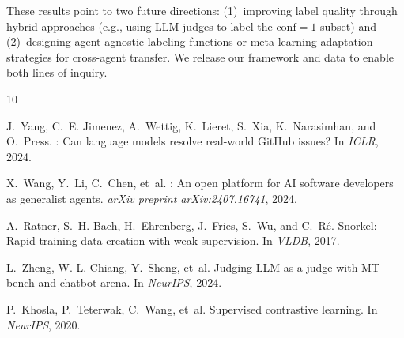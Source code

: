 \documentclass[11pt]{article}
\begin{document}
These results point to two future directions: (1)~improving label quality through hybrid approaches (e.g., using LLM judges to label the $\text{conf}\!=\!1$ subset) and (2)~designing agent-agnostic labeling functions or meta-learning adaptation strategies for cross-agent transfer.
We release our framework and data to enable both lines of inquiry.


\begin{thebibliography}{10}

J.~Yang, C.~E. Jimenez, A.~Wettig, K.~Lieret, S.~Xia, K.~Narasimhan, and O.~Press.
: Can language models resolve real-world {GitHub} issues?
\newblock In \emph{ICLR}, 2024.

X.~Wang, Y.~Li, C.~Chen, et~al.
: An open platform for {AI} software developers as generalist agents.
\newblock \emph{arXiv preprint arXiv:2407.16741}, 2024.

A.~Ratner, S.~H. Bach, H.~Ehrenberg, J.~Fries, S.~Wu, and C.~R\'{e}.
\newblock Snorkel: Rapid training data creation with weak supervision.
\newblock In \emph{VLDB}, 2017.

L.~Zheng, W.-L. Chiang, Y.~Sheng, et~al.
\newblock Judging {LLM}-as-a-judge with {MT}-bench and chatbot arena.
\newblock In \emph{NeurIPS}, 2024.

P.~Khosla, P.~Teterwak, C.~Wang, et~al.
\newblock Supervised contrastive learning.
\newblock In \emph{NeurIPS}, 2020.

\end{thebibliography}
\end{document}
